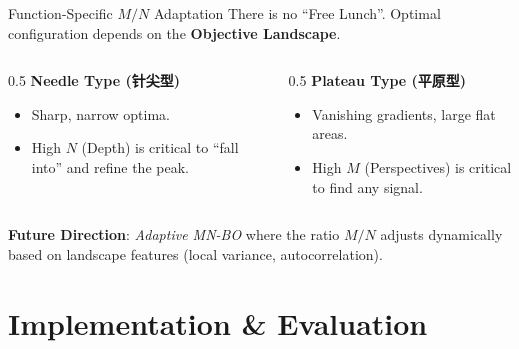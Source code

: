 \documentclass[10pt, aspectratio=169]{beamer}
\begin{document}
\begin{frame}{Function-Specific $M/N$ Adaptation}
    There is no ``Free Lunch''. Optimal configuration depends on the \textbf{Objective Landscape}.
    
    \begin{columns}
        \begin{column}{0.5\textwidth}
            \centering
            \textbf{Needle Type (针尖型)}
            \begin{itemize}
                \item Sharp, narrow optima.
                \item High $N$ (Depth) is critical to ``fall into'' and refine the peak.
            \end{itemize}
        \end{column}
        \begin{column}{0.5\textwidth}
            \centering
            \textbf{Plateau Type (平原型)}
            \begin{itemize}
                \item Vanishing gradients, large flat areas.
                \item High $M$ (Perspectives) is critical to find any signal.
            \end{itemize}
        \end{column}
    \end{columns}
    
    \vspace{0.4cm}
    \textbf{Future Direction}: \textit{Adaptive MN-BO} where the ratio $M/N$ adjusts dynamically based on landscape features (local variance, autocorrelation).
\end{frame}

\section{Implementation \& Evaluation}
\end{document}
